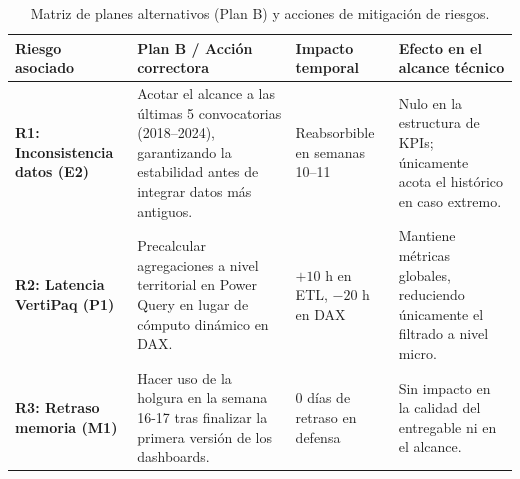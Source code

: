\documentclass[12pt, a4paper, twoside]{report}
\begin{document}
\begin{table}[H] 
\centering
\scriptsize
\renewcommand{\arraystretch}{1.50}
\setlength{\tabcolsep}{3pt}
\caption{Matriz de planes alternativos (Plan B) y acciones de mitigación de riesgos.}
\label{tab:matriz_planes_b}
\begin{tabularx}{\textwidth}{@{} p{2.7cm} p{4.5cm} p{2.3cm} X @{}}
\toprule
\textbf{Riesgo asociado} & \textbf{Plan B / Acción correctora} & \textbf{Impacto temporal} & \textbf{Efecto en el alcance técnico} \\ \midrule
\textbf{R1: Inconsistencia datos (E2)} & Acotar el alcance a las últimas 5 convocatorias (2018--2024), garantizando la estabilidad antes de integrar datos más antiguos. & Reabsorbible en semanas 10--11 & Nulo en la estructura de KPIs; únicamente acota el histórico en caso extremo. \\ \addlinespace[1pt]
\textbf{R2: Latencia VertiPaq (P1)} & Precalcular agregaciones a nivel territorial en Power Query en lugar de cómputo dinámico en DAX. & $+10$ h en ETL, $-20$ h en DAX & Mantiene métricas globales, reduciendo únicamente el filtrado a nivel micro. \\ \addlinespace[1pt]
\textbf{R3: Retraso memoria (M1)} & Hacer uso de la holgura en la semana 16-17 tras finalizar la primera versión de los dashboards. & $0$ días de retraso en defensa & Sin impacto en la calidad del entregable ni en el alcance. \\ \bottomrule
\end{tabularx}
\end{table}

\clearpage


\end{document}
